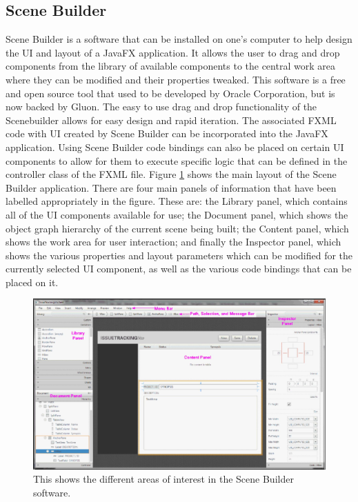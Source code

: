 \subsection{Scene Builder}
Scene Builder is a software that can be installed on one's computer to help design the UI and layout of a JavaFX application. It allows the user to drag and drop components from the library of available components to the central work area where they can be modified and their properties tweaked. This software is a free and open source tool that used to be developed by Oracle Corporation, but is now backed by Gluon. The easy to use drag and drop functionality of the Scenebuilder allows for easy design and rapid iteration. The associated FXML code with UI created by Scene Builder can be incorporated into the JavaFX application. Using Scene Builder code bindings can also be placed on certain UI components to allow for them to execute specific logic that can be defined in the controller class of the FXML file. Figure \ref{fig:sceneBuilderWindow} shows the main layout of the Scene Builder application. There are four main panels of information that have been labelled appropriately in the figure. These are: the Library panel, which contains all of the UI components available for use; the Document panel, which shows the object graph hierarchy of the current scene being built; the Content panel, which shows the work area for user interaction; and finally the Inspector panel, which shows the various properties and layout parameters which can be modified for the currently selected UI component, as well as the various code bindings that can be placed on it. 

\begin{figure}[th]
\centering
\includegraphics[scale=0.35]{Figures/sceneBuilderWindow.JPG}
\caption{This shows the different areas of interest in the Scene Builder software.}
\label{fig:sceneBuilderWindow}
\end{figure}




